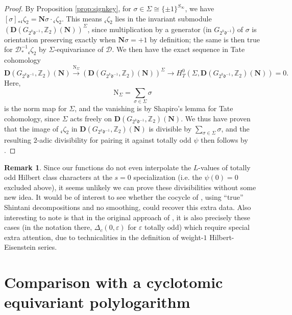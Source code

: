 \documentclass[10pt]{amsart}
\theoremstyle{definition}
\newtheorem{rem}[thm]{Remark}
\newcommand{\Z}{\mathbb{Z}}
\renewcommand{\c}{\mathfrak{c}}
\renewcommand{\d}{\mathfrak{d}}
\newcommand{\D}{\mathbf{D}}
\numberwithin{equation}{section}
\begin{document}
\begin{proof}
        By Proposition \ref{prop:signkey}, for $\sigma\in \Sigma \cong \{\pm 1\}^{S_\infty}$, we have $[\sigma]_* {}_\c\zeta_2 = \mathbf{N}\sigma \cdot {}_\c\zeta_2$. This means ${}_\c\zeta_2$ lies in the invariant submodule $(\D(G_{2^k\d^{-1}}, \Z_2)(\mathbf{N}))^{\Sigma}$, since multiplication by a generator (in $G_{2^k\d^{-1}}$) of $\sigma$ is orientation preserving exactly when $\mathbf{N}\sigma =+1$ by definition; the same is then true for $\mathcal{D}_*^{-1} {}_\c \zeta_2$ by $\Sigma$-equivariance of $\mathcal{D}$. We then have the exact sequence in Tate cohomology
        \[
        \D(G_{2^k\d^{-1}}, \Z_2)(\mathbf{N}) \xrightarrow{\mathrm{N}_\Sigma} (\D(G_{2^k\d^{-1}}, \Z_2)(\mathbf{N}))^\Sigma \to H^0_T(\Sigma, \D(G_{2^k\d^{-1}}, \Z_2)(\mathbf{N}) )=0.
        \]
        Here, 
        \[
        \mathrm{N}_\Sigma=\sum_{\sigma \in \Sigma} \sigma
        \]
        is the norm map for $\Sigma$, and the vanishing is by Shapiro's lemma for Tate cohomology, since $\Sigma$ acts freely on $\D(G_{2^k\d^{-1}}, \Z_2)(\mathbf{N})$. We thus have proven that the image of ${}_\c\zeta_2$ in $\D(G_{2^k\d^{-1}}, \Z_2)(\mathbf{N})$ is divisible by $\sum_{\sigma \in \Sigma} \sigma$, and the resulting $2$-adic divisibility for pairing it against totally odd $\psi$ then follows by \cite[Lemma 5.3]{Gro}.
    \end{proof}

    \begin{rem}
    Since our functions do not even interpolate the $L$-values of totally odd Hilbert class characters at the $s=0$ specialization (i.e. the $\psi(0)=0$ excluded above), it seems unlikely we can prove these divisibilities without some new idea. It would be of interest to see whether the cocycle of \cite{CDG}, using ``true'' Shintani decompositions and no smoothing, could recover this extra data. Also interesting to note is that in the original approach of \cite[(8.6--10)]{DR}, it is also precisely these cases (in the notation there, $\Delta_c(0, \varepsilon)$ for $\varepsilon$ totally odd) which require special extra attention, due to technicalities in the definition of weight-$1$ Hilbert-Eisenstein series.
    \end{rem}
    
    \appendix

    \section{Comparison with a cyclotomic equivariant polylogarithm} \label{appendix:a}
\end{document}
